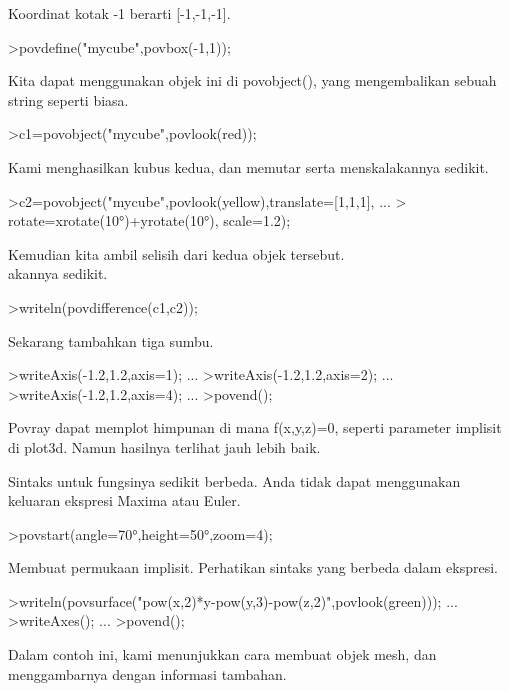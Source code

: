 \documentclass{article}
\begin{document}
\begin{eulernotebook}
\begin{eulercomment}
Koordinat kotak -1 berarti [-1,-1,-1].
\end{eulercomment}
\begin{eulerprompt}
>povdefine("mycube",povbox(-1,1));
\end{eulerprompt}
\begin{eulercomment}
Kita dapat menggunakan objek ini di povobject(), yang mengembalikan
sebuah string seperti biasa.
\end{eulercomment}
\begin{eulerprompt}
>c1=povobject("mycube",povlook(red));
\end{eulerprompt}
\begin{eulercomment}
Kami menghasilkan kubus kedua, dan memutar serta menskalakannya
sedikit.
\end{eulercomment}
\begin{eulerprompt}
>c2=povobject("mycube",povlook(yellow),translate=[1,1,1], ...
>  rotate=xrotate(10°)+yrotate(10°), scale=1.2);
\end{eulerprompt}
\begin{eulercomment}
Kemudian kita ambil selisih dari kedua objek tersebut.\\
akannya sedikit.
\end{eulercomment}
\begin{eulerprompt}
>writeln(povdifference(c1,c2));
\end{eulerprompt}
\begin{eulercomment}
Sekarang tambahkan tiga sumbu.
\end{eulercomment}
\begin{eulerprompt}
>writeAxis(-1.2,1.2,axis=1); ...
>writeAxis(-1.2,1.2,axis=2); ...
>writeAxis(-1.2,1.2,axis=4); ...
>povend();
\end{eulerprompt}
\begin{eulercomment}
Povray dapat memplot himpunan di mana f(x,y,z)=0, seperti parameter
implisit di plot3d. Namun hasilnya terlihat jauh lebih baik.

Sintaks untuk fungsinya sedikit berbeda. Anda tidak dapat menggunakan
keluaran ekspresi Maxima atau Euler.
\end{eulercomment}
\begin{eulerprompt}
>povstart(angle=70°,height=50°,zoom=4);
\end{eulerprompt}
\begin{eulercomment}
Membuat permukaan implisit. Perhatikan sintaks yang berbeda dalam
ekspresi.
\end{eulercomment}
\begin{eulerprompt}
>writeln(povsurface("pow(x,2)*y-pow(y,3)-pow(z,2)",povlook(green))); ...
>writeAxes(); ...
>povend();
\end{eulerprompt}
\begin{eulercomment}
Dalam contoh ini, kami menunjukkan cara membuat objek mesh, dan
menggambarnya dengan informasi tambahan.


\end{eulercomment}
\end{eulernotebook}
\end{document}
